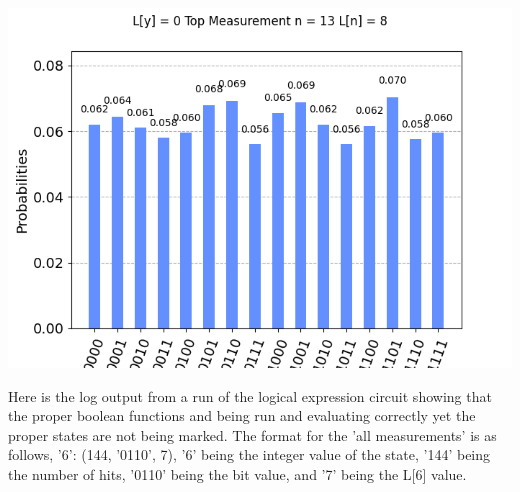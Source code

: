 \documentclass[11pt]{article}
\begin{document}
\includegraphics[width=\textwidth]{custom_4.png}
\centering

\newpage
Here is the log output from a run of the logical expression circuit showing that the proper boolean functions and being run and evaluating correctly yet the proper states are not being marked. The format for the 'all measurements' is as follows, '6': (144, '0110', 7), '6' being the integer value of the state, '144' being the number of hits, '0110' being the bit value, and '7' being the L[6] value. 
\end{document}
